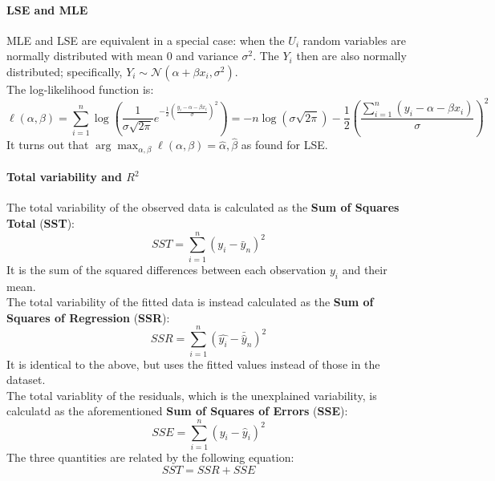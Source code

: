 \paragraph{LSE and MLE}
MLE and LSE are equivalent in a special case: when the $U_i$ random variables are normally distributed with mean 0 and variance $\sigma^2$. The $Y_i$ then are also normally distributed; specifically, $Y_i \sim \mathcal{N}(\alpha + \beta x_i, \sigma^2)$. \\
The log-likelihood function is:
\begin{equation*}
    \ell(\alpha, \beta) = \sum_{i=1}^n \log \left( \frac{1}{\sigma \sqrt{2 \pi}} e^{-\frac{1}{2} \left(\frac{y_i - \alpha - \beta x_i}{\sigma}\right)^2}\right) = -n \log(\sigma \sqrt{2 \pi}) - \frac{1}{2} \left(\frac{\sum_{i=1}^n (y_i - \alpha - \beta x_i)}{\sigma}\right)^2
\end{equation*}   
It turns out that $\arg \max_{\alpha, \beta} \ell(\alpha, \beta) = \hat{\alpha}, \hat{\beta}$ as found for LSE.

\paragraph{Total variability and $R^2$}
The total variability of the observed data is calculated as the \textbf{Sum of Squares Total} (\textbf{SST}):
\begin{equation*}
    SST = \sum_{i=1}^n (y_i - \bar{y}_n)^2
\end{equation*}   
It is the sum of the squared differences between each observation $y_i$ and their mean.\\
The total variability of the fitted data is instead calculated as the \textbf{Sum of Squares of Regression} (\textbf{SSR}):
\begin{equation*}
    SSR = \sum_{i=1}^n (\hat{y_i} - \bar{\hat{y}}_n)^2
\end{equation*}   
It is identical to the above, but uses the fitted values instead of those in the dataset.\\
The total variablity of the residuals, which is the unexplained variability, is calculatd as the aforementioned \textbf{Sum of Squares of Errors} (\textbf{SSE}):
\begin{equation*}
    SSE = \sum_{i=1}^n (y_i - \hat{y}_i)^2
\end{equation*}   
The three quantities are related by the following equation:
\begin{equation*}
    SST = SSR + SSE
\end{equation*}   

